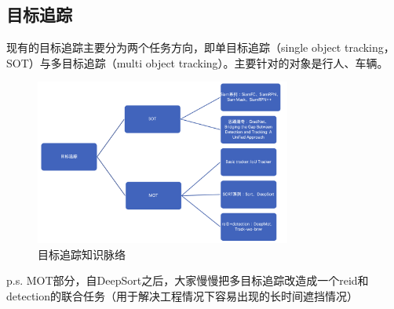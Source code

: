 \documentclass[lang=cn,11pt,a4paper]{eleganttemplate}
\begin{document}
\subsection{目标追踪}
现有的目标追踪主要分为两个任务方向，即单目标追踪（single object tracking，SOT）与多目标追踪（multi object tracking）。主要针对的对象是行人、车辆。
\begin{figure}[htbp]
  \centering
  \includegraphics[width=0.75\textwidth]{image/cv_6.png}
  \caption{目标追踪知识脉络}
\end{figure}
p.s. MOT部分，自DeepSort之后，大家慢慢把多目标追踪改造成一个reid和detection的联合任务（用于解决工程情况下容易出现的长时间遮挡情况）

\hfill
\end{document}
